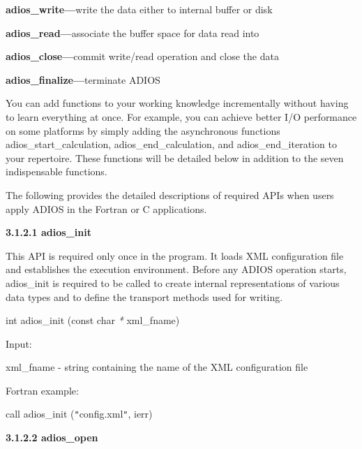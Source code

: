 \textbf{adios\_write---}write the data either to internal buffer or disk

\textbf{adios\_read---}associate the buffer space for data read into

\textbf{adios\_close---}commit write/read operation and close the data

\textbf{adios\_finalize---}terminate ADIOS

You can add functions to your working knowledge incrementally without having to 
learn everything at once. For example, you can achieve better I/O performance on 
some platforms by simply adding the asynchronous functions adios\_start\_calculation, 
adios\_end\_calculation, and adios\_end\_iteration to your repertoire. These functions 
will be detailed below in addition to the seven indispensable functions.

The following provides the detailed descriptions of required APIs when users apply 
ADIOS in the Fortran or C applications.

\textbf{3.1.2.1 adios\_init}

This API is required only once in the program. It loads XML configuration file 
and establishes the execution environment. Before any ADIOS operation starts, adios\_init 
is required to be called to create internal representations of various data types 
and to define the transport methods used for writing. 

\leftskip=22pt
int adios\_init (const char  \textit{* }xml\_fname)

\leftskip=22pt
Input: 

\leftskip=45pt
xml\_fname - string containing the name of the XML configuration file

\leftskip=22pt
Fortran example: 

\parindent=13pt
call adios\_init (\texttt{"}config.xml\texttt{"}, ierr)

\leftskip=0pt
\parindent=0pt
\textbf{3.1.2.2 adios\_open}

